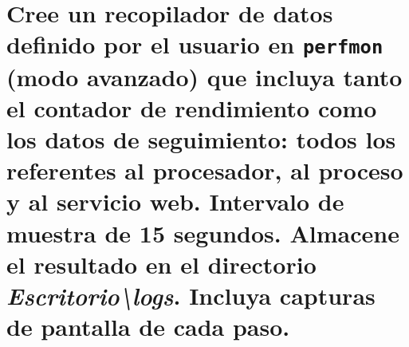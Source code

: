 \documentclass[10pt,a4paper,spanish]{article}
\numberwithin{equation}{section} %
\numberwithin{figure}{section} %
\numberwithin{table}{section} %
\begin{document}

\section{Cree un recopilador de datos definido por el usuario  en \texttt{perfmon} (modo avanzado) que incluya tanto el contador de rendimiento como los datos de seguimiento: todos los referentes al procesador, al proceso y al servicio web. Intervalo de muestra de 15 segundos. Almacene el resultado en el directorio \textit{Escritorio\textbackslash logs}. Incluya capturas de pantalla de cada paso.}
\end{document}
